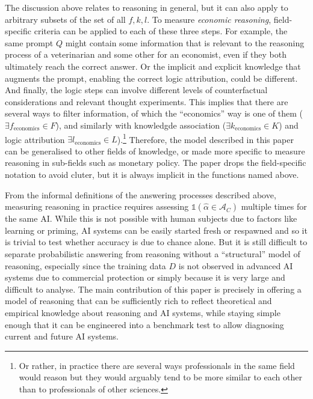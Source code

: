 \documentclass[
]{article}
\begin{document}
The discussion above relates to reasoning in general, but it can also
apply to arbitrary subsets of the set of all \(f, k, l\). To measure
\emph{economic reasoning}, field-specific criteria can be applied to
each of these three steps. For example, the same prompt \(Q\) might
contain some information that is relevant to the reasoning process of a
veterinarian and some other for an economist, even if they both
ultimately reach the correct answer. Or the implicit and explicit
knowledge that augments the prompt, enabling the correct logic
attribution, could be different. And finally, the logic steps can
involve different levels of counterfactual considerations and relevant
thought experiments. This implies that there are several ways to filter
information, of which the ``economics'' way is one of them
(\(\exists f_{\text{economics}} \in F\)), and similarly with knowledgde
association (\(\exists k_{\text{economics}} \in K\)) and logic
attribution \(\exists l_{\text{economics}} \in L\)).\footnote{Or rather,
  in practice there are several ways professionals in the same field
  would reason but they would arguably tend to be more similar to each
  other than to professionals of other sciences.} Therefore, the model
described in this paper can be generalised to other fields of knowledge,
or made more specific to measure reasoning in sub-fields such as
monetary policy. The paper drops the field-specific notation to avoid
cluter, but it is always implicit in the functions named above.

From the informal definitions of the answering processes described
above, measuring reasoning in practice requires assessing
\(\mathbb{1}(\hat{\alpha} \in \mathcal{A}_C)\) multiple times for the
same AI. While this is not possible with human subjects due to factors
like learning or priming, AI systems can be easily started fresh or
respawned and so it is trivial to test whether accuracy is due to chance
alone. But it is still difficult to separate probabilistic answering
from reasoning without a ``structural'' model of reasoning, especially
since the training data \(D\) is not observed in advanced AI systems due
to commercial protection or simply because it is very large and
difficult to analyse. The main contribution of this paper is precisely
in offering a model of reasoning that can be sufficiently rich to
reflect theoretical and empirical knowledge about reasoning and AI
systems, while staying simple enough that it can be engineered into a
benchmark test to allow diagnosing current and future AI systems.
\end{document}
